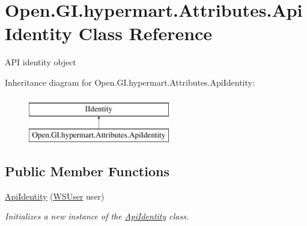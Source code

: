\hypertarget{class_open_1_1_g_i_1_1hypermart_1_1_attributes_1_1_api_identity}{}\section{Open.\+G\+I.\+hypermart.\+Attributes.\+Api\+Identity Class Reference}
\label{class_open_1_1_g_i_1_1hypermart_1_1_attributes_1_1_api_identity}


A\+PI identity object  


Inheritance diagram for Open.\+G\+I.\+hypermart.\+Attributes.\+Api\+Identity\+:\begin{figure}[H]
\begin{center}
\leavevmode
\includegraphics[height=2.000000cm]{class_open_1_1_g_i_1_1hypermart_1_1_attributes_1_1_api_identity}
\end{center}
\end{figure}
\subsection*{Public Member Functions}
\begin{DoxyCompactItemize}
\item 
\hyperlink{class_open_1_1_g_i_1_1hypermart_1_1_attributes_1_1_api_identity_a0ca1c38ef87fde2fb7b816fde06e6ebe}{Api\+Identity} (\hyperlink{class_open_1_1_g_i_1_1hypermart_1_1_models_1_1_w_s_user}{W\+S\+User} user)
\begin{DoxyCompactList}\small\item\em Initializes a new instance of the \hyperlink{class_open_1_1_g_i_1_1hypermart_1_1_attributes_1_1_api_identity}{Api\+Identity} class. \end{DoxyCompactList}\end{DoxyCompactItemize}
